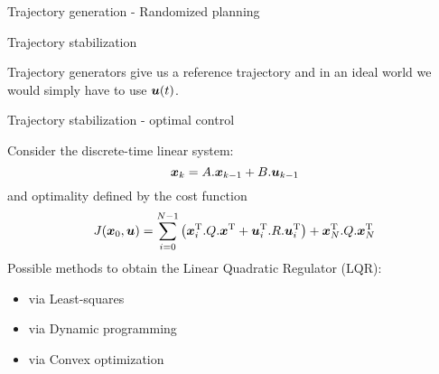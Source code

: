 \documentclass[usenames,dvipsnames,xcolor=table]{beamer}
\begin{document}
\begin{frame}{Trajectory generation - Randomized planning}
\end{frame}
\begin{frame}{Trajectory stabilization}
\begin{center}
Trajectory generators give us a reference trajectory and in an ideal world we would simply have to use $ \boldsymbol{u} (t)$.\\
\end{center}
\end{frame}
\begin{frame}{Trajectory stabilization - optimal control}
\begin{center}
Consider the discrete-time linear system:
\begin{equation*}
 \boldsymbol{x} _k = A. \boldsymbol{x} _{k-1} + B. \boldsymbol{u} _{k-1}
\end{equation*}
and optimality defined by the cost function
\begin{equation}
J( \boldsymbol{x} _0,  \boldsymbol{u} ) = \sum_{{i=0}}^{{N-1}}\left( {\boldsymbol{x} }^{\text{T}}_i.Q. {\boldsymbol{x} }^{\text{T}} + { \boldsymbol{u} }^{\text{T}}_i.R.{ \boldsymbol{u} }^{\text{T}}_i\right) +  {\boldsymbol{x} }^{\text{T}}_N.Q. {\boldsymbol{x} }^{\text{T}}_N
\end{equation}
Possible methods to obtain the Linear Quadratic Regulator (LQR):\\[6pt]
\begin{minipage}[c]{0.5\linewidth}
\begin{itemize}
\item via Least-squares
\item via Dynamic programming
\item via Convex optimization
\end{itemize}
\end{minipage}
\end{center}
\end{frame}
\end{document}
